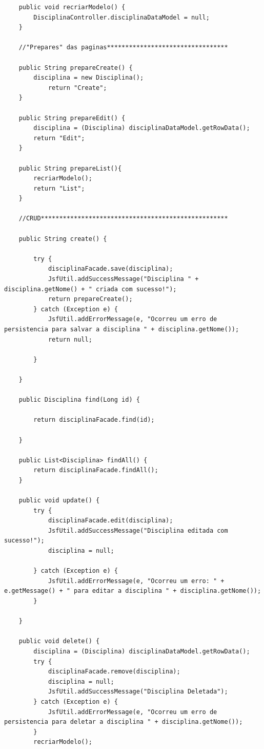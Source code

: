 \documentclass[12pt,a4paper]{article}
\begin{document}
\begin{lstlisting}
    public void recriarModelo() {
        DisciplinaController.disciplinaDataModel = null;
    }

    //"Prepares" das paginas*********************************
    
    public String prepareCreate() {
        disciplina = new Disciplina();
            return "Create";
    }

    public String prepareEdit() {
        disciplina = (Disciplina) disciplinaDataModel.getRowData();
        return "Edit";
    }
    
    public String prepareList(){
        recriarModelo();
        return "List";
    }

    //CRUD***************************************************
   
    public String create() {

        try {
            disciplinaFacade.save(disciplina);
            JsfUtil.addSuccessMessage("Disciplina " + disciplina.getNome() + " criada com sucesso!");
            return prepareCreate();
        } catch (Exception e) {
            JsfUtil.addErrorMessage(e, "Ocorreu um erro de persistencia para salvar a disciplina " + disciplina.getNome());
            return null;

        }

    }

    public Disciplina find(Long id) {

        return disciplinaFacade.find(id);

    }

    public List<Disciplina> findAll() {
        return disciplinaFacade.findAll();
    }
    
    public void update() {
        try {
            disciplinaFacade.edit(disciplina);
            JsfUtil.addSuccessMessage("Disciplina editada com sucesso!");
            disciplina = null;

        } catch (Exception e) {
            JsfUtil.addErrorMessage(e, "Ocorreu um erro: " + e.getMessage() + " para editar a disciplina " + disciplina.getNome());
        }

    }

    public void delete() {
        disciplina = (Disciplina) disciplinaDataModel.getRowData();
        try {
            disciplinaFacade.remove(disciplina);
            disciplina = null;
            JsfUtil.addSuccessMessage("Disciplina Deletada");
        } catch (Exception e) {
            JsfUtil.addErrorMessage(e, "Ocorreu um erro de persistencia para deletar a disciplina " + disciplina.getNome());
        }
        recriarModelo();


\end{lstlisting}
\end{document}
